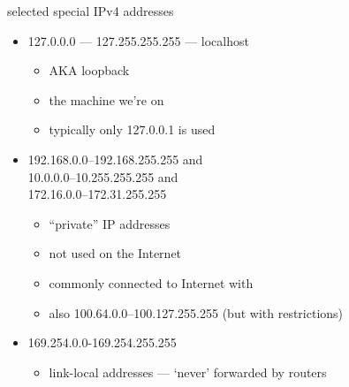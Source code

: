 \begin{frame}{selected special IPv4 addresses}
\begin{itemize}
\item 127.0.0.0 --- 127.255.255.255 --- localhost
    \begin{itemize}
    \item AKA loopback
    \item the machine we're on
    \item typically only 127.0.0.1 is used
    \end{itemize}
\item 192.168.0.0--192.168.255.255 and \\ 10.0.0.0--10.255.255.255 and \\ 172.16.0.0--172.31.255.255 
    \begin{itemize}
    \item ``private'' IP addresses
    \item not used on the Internet
    \item commonly connected to Internet with 
    \item also 100.64.0.0--100.127.255.255 (but with restrictions)
    \end{itemize}
\item 169.254.0.0-169.254.255.255
    \begin{itemize}
    \item link-local addresses --- `never' forwarded by routers
    \end{itemize}
\end{itemize}
\end{frame}

